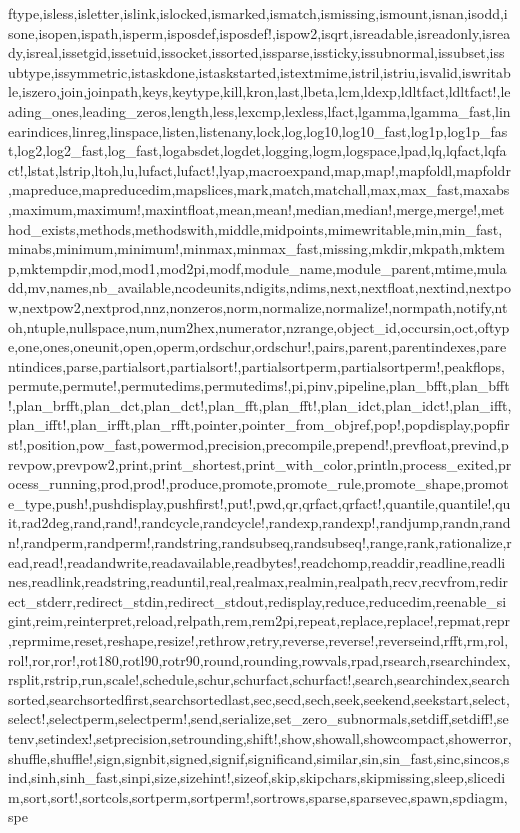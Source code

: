 {ftype,isless,isletter,islink,islocked,ismarked,ismatch,ismissing,ismount,isnan,isodd,isone,isopen,ispath,isperm,isposdef,isposdef!,ispow2,isqrt,isreadable,isreadonly,isready,isreal,issetgid,issetuid,issocket,issorted,issparse,issticky,issubnormal,issubset,issubtype,issymmetric,istaskdone,istaskstarted,istextmime,istril,istriu,isvalid,iswritable,iszero,join,joinpath,keys,keytype,kill,kron,last,lbeta,lcm,ldexp,ldltfact,ldltfact!,leading_ones,leading_zeros,length,less,lexcmp,lexless,lfact,lgamma,lgamma_fast,linearindices,linreg,linspace,listen,listenany,lock,log,log10,log10_fast,log1p,log1p_fast,log2,log2_fast,log_fast,logabsdet,logdet,logging,logm,logspace,lpad,lq,lqfact,lqfact!,lstat,lstrip,ltoh,lu,lufact,lufact!,lyap,macroexpand,map,map!,mapfoldl,mapfoldr,mapreduce,mapreducedim,mapslices,mark,match,matchall,max,max_fast,maxabs,maximum,maximum!,maxintfloat,mean,mean!,median,median!,merge,merge!,method_exists,methods,methodswith,middle,midpoints,mimewritable,min,min_fast,minabs,minimum,minimum!,minmax,minmax_fast,missing,mkdir,mkpath,mktemp,mktempdir,mod,mod1,mod2pi,modf,module_name,module_parent,mtime,muladd,mv,names,nb_available,ncodeunits,ndigits,ndims,next,nextfloat,nextind,nextpow,nextpow2,nextprod,nnz,nonzeros,norm,normalize,normalize!,normpath,notify,ntoh,ntuple,nullspace,num,num2hex,numerator,nzrange,object_id,occursin,oct,oftype,one,ones,oneunit,open,operm,ordschur,ordschur!,pairs,parent,parentindexes,parentindices,parse,partialsort,partialsort!,partialsortperm,partialsortperm!,peakflops,permute,permute!,permutedims,permutedims!,pi,pinv,pipeline,plan_bfft,plan_bfft!,plan_brfft,plan_dct,plan_dct!,plan_fft,plan_fft!,plan_idct,plan_idct!,plan_ifft,plan_ifft!,plan_irfft,plan_rfft,pointer,pointer_from_objref,pop!,popdisplay,popfirst!,position,pow_fast,powermod,precision,precompile,prepend!,prevfloat,prevind,prevpow,prevpow2,print,print_shortest,print_with_color,println,process_exited,process_running,prod,prod!,produce,promote,promote_rule,promote_shape,promote_type,push!,pushdisplay,pushfirst!,put!,pwd,qr,qrfact,qrfact!,quantile,quantile!,quit,rad2deg,rand,rand!,randcycle,randcycle!,randexp,randexp!,randjump,randn,randn!,randperm,randperm!,randstring,randsubseq,randsubseq!,range,rank,rationalize,read,read!,readandwrite,readavailable,readbytes!,readchomp,readdir,readline,readlines,readlink,readstring,readuntil,real,realmax,realmin,realpath,recv,recvfrom,redirect_stderr,redirect_stdin,redirect_stdout,redisplay,reduce,reducedim,reenable_sigint,reim,reinterpret,reload,relpath,rem,rem2pi,repeat,replace,replace!,repmat,repr,reprmime,reset,reshape,resize!,rethrow,retry,reverse,reverse!,reverseind,rfft,rm,rol,rol!,ror,ror!,rot180,rotl90,rotr90,round,rounding,rowvals,rpad,rsearch,rsearchindex,rsplit,rstrip,run,scale!,schedule,schur,schurfact,schurfact!,search,searchindex,searchsorted,searchsortedfirst,searchsortedlast,sec,secd,sech,seek,seekend,seekstart,select,select!,selectperm,selectperm!,send,serialize,set_zero_subnormals,setdiff,setdiff!,setenv,setindex!,setprecision,setrounding,shift!,show,showall,showcompact,showerror,shuffle,shuffle!,sign,signbit,signed,signif,significand,similar,sin,sin_fast,sinc,sincos,sind,sinh,sinh_fast,sinpi,size,sizehint!,sizeof,skip,skipchars,skipmissing,sleep,slicedim,sort,sort!,sortcols,sortperm,sortperm!,sortrows,sparse,sparsevec,spawn,spdiagm,spe}
